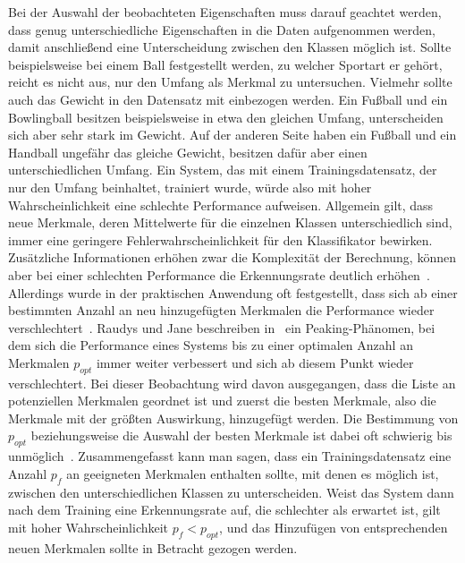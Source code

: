 Bei der Auswahl der beobachteten Eigenschaften muss darauf geachtet werden, dass genug unterschiedliche Eigenschaften in die Daten aufgenommen werden, damit anschließend eine Unterscheidung zwischen den Klassen möglich ist. Sollte beispielsweise bei einem Ball festgestellt werden, zu welcher Sportart er gehört, reicht es nicht aus, nur den Umfang als Merkmal zu untersuchen. Vielmehr sollte auch das Gewicht in den Datensatz mit einbezogen werden. Ein Fußball und ein Bowlingball besitzen beispielsweise in etwa den gleichen Umfang, unterscheiden sich aber sehr stark im Gewicht. Auf der anderen Seite haben ein Fußball und ein Handball ungefähr das gleiche Gewicht, besitzen dafür aber einen unterschiedlichen Umfang. Ein System, das mit einem Trainingsdatensatz, der nur den Umfang beinhaltet, trainiert wurde, würde also mit hoher Wahrscheinlichkeit eine schlechte Performance aufweisen. Allgemein gilt, dass neue Merkmale, deren Mittelwerte für die einzelnen Klassen unterschiedlich sind, immer eine geringere Fehlerwahrscheinlichkeit für den Klassifikator bewirken. Zusätzliche Informationen erhöhen zwar die Komplexität der Berechnung, können aber bei einer schlechten Performance die Erkennungsrate deutlich erhöhen~\cite{sampleSize}. Allerdings wurde in der praktischen Anwendung oft festgestellt, dass sich ab einer bestimmten Anzahl an neu hinzugefügten Merkmalen die Performance wieder verschlechtert~\cite{patternClassification3}. Raudys und Jane beschreiben in~\cite{sampleSize} ein \glqq Peaking\grqq{}-Phänomen, bei dem sich die Performance eines Systems bis zu einer optimalen Anzahl an Merkmalen $p_{opt}$ immer weiter verbessert und sich ab diesem Punkt wieder verschlechtert. Bei dieser Beobachtung wird davon ausgegangen, dass die Liste an potenziellen Merkmalen geordnet ist und zuerst die \glqq besten\grqq{} Merkmale, also die Merkmale mit der größten Auswirkung, hinzugefügt werden. Die Bestimmung von $p_{opt}$ beziehungsweise die Auswahl der \glqq besten\grqq{} Merkmale ist dabei oft schwierig bis unmöglich~\cite{sampleSize}. Zusammengefasst kann man sagen, dass ein Trainingsdatensatz eine Anzahl $p_{f}$ an geeigneten Merkmalen enthalten sollte, mit denen es möglich ist, zwischen den unterschiedlichen Klassen zu unterscheiden. Weist das System dann nach dem Training eine Erkennungsrate auf, die schlechter als erwartet ist, gilt mit hoher Wahrscheinlichkeit $p_{f}<p_{opt}$, und das Hinzufügen von entsprechenden neuen Merkmalen sollte in Betracht gezogen werden.

